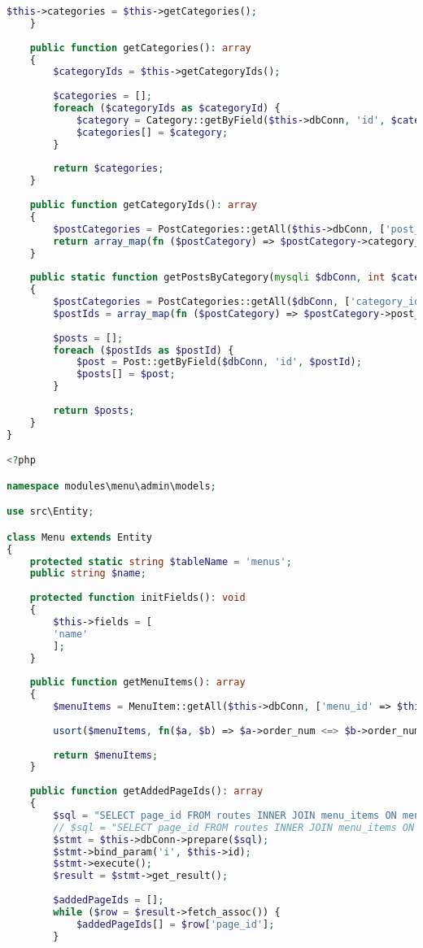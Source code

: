 \begin{lstlisting}[language=PHP, frame=none]
		$this->categories = $this->getCategories();
	}
	
	public function getCategories(): array
	{
		$categoryIds = $this->getCategoryIds();
		
		$categories = [];
		foreach ($categoryIds as $categoryId) {
			$category = Category::getByField($this->dbConn, 'id', $categoryId);
			$categories[] = $category;
		}
		
		return $categories;
	}
	
	public function getCategoryIds(): array
	{
		$postCategories = PostCategories::getAll($this->dbConn, ['post_id' => $this->id]);
		return array_map(fn ($postCategory) => $postCategory->category_id, $postCategories);
	}
	
	public static function getPostsByCategory(mysqli $dbConn, int $categoryId): array
	{
		$postCategories = PostCategories::getAll($dbConn, ['category_id' => $categoryId]);
		$postIds = array_map(fn ($postCategory) => $postCategory->post_id, $postCategories);
		
		$posts = [];
		foreach ($postIds as $postId) {
			$post = Post::getByField($dbConn, 'id', $postId);
			$posts[] = $post;
		}
		
		return $posts;
	}
}

<?php

namespace modules\menu\admin\models;

use src\Entity;

class Menu extends Entity
{
	protected static string $tableName = 'menus';
	public string $name;
	
	protected function initFields(): void
	{
		$this->fields = [
		'name'
		];
	}
	
	public function getMenuItems(): array
	{
		$menuItems = MenuItem::getAll($this->dbConn, ['menu_id' => $this->id]);
		
		usort($menuItems, fn($a, $b) => $a->order_num <=> $b->order_num);
		
		return $menuItems;
	}
	
	public function getAddedPageIds(): array
	{
		$sql = "SELECT page_id FROM routes INNER JOIN menu_items ON menu_items.route_id=routes.id WHERE menu_items.menu_id=?";
		// $sql = "SELECT page_id FROM routes INNER JOIN menu_items ON menu_items.url=routes.path WHERE menu_items.menu_id=$menu_id";
		$stmt = $this->dbConn->prepare($sql);
		$stmt->bind_param('i', $this->id);
		$stmt->execute();
		$result = $stmt->get_result();
		
		$addedPageIds = [];
		while ($row = $result->fetch_assoc()) {
			$addedPageIds[] = $row['page_id'];
		}
		

\end{lstlisting}
